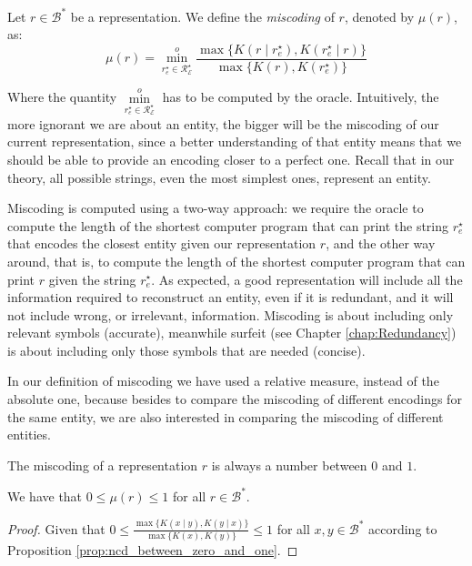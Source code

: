 \begin{definition} [Miscoding]
\label{def:miscoding}
Let $r \in \mathcal{B}^\ast$ be a representation. We define the \emph{miscoding} of $r$, denoted by $\mu(r)$, as:
\[
\mu(r) = \overset{o}{ \underset{ r^\star_e \in \mathcal{R}^\star_\mathcal{E} } \min} \frac{ \max\{ K \left( r \mid r^\star_e \right), K \left( r^\star_e \mid r \right) \} } { \max\{ K \left( r \right), K \left( r^\star_e \right) \} }
\]
\end{definition}

Where the quantity $\overset{o}{ \underset{ r^\star_e \in \mathcal{R}^\star_\mathcal{E} } \min}$ has to be computed by the oracle. Intuitively, the more ignorant we are about an entity, the bigger will be the miscoding of our current representation, since a better understanding of that entity means that we should be able to provide an encoding closer to a perfect one. Recall that in our theory, all possible strings, even the most simplest ones, represent an entity.

Miscoding is computed using a two-way approach: we require the oracle to compute the length of the shortest computer program that can print the string $r^\star_e$ that encodes the closest entity given our representation $r$, and the other way around, that is, to compute the length of the shortest computer program that can print $r$ given the string $r^\star_e$. As expected, a good representation will include all the information required to reconstruct an entity, even if it is redundant, and it will not include wrong, or irrelevant, information. Miscoding is about including only relevant symbols (accurate), meanwhile surfeit (see Chapter \ref{chap:Redundancy}) is about including only those symbols that are needed (concise).

In our definition of miscoding we have used a relative measure, instead of the absolute one, because besides to compare the miscoding of different encodings for the same entity, we are also interested in comparing the miscoding of different entities.

The miscoding of a representation $r$ is always a number between $0$ and $1$.

\begin{proposition}
\label{prop:range_miscoding}
We have that $0 \leq \mu(r) \leq 1$ for all $r \in \mathcal{B}^\ast$.
\end{proposition}
\begin{proof}
Given that $0 \leq \frac{ \max\{ K(x \mid y), K(y \mid x) \} } { \max\{ K(x), K(y) \} } \leq 1$ for all $x, y \in \mathcal{B}^\ast$ according to Proposition \ref{prop:ncd_between_zero_and_one}.
\end{proof}


